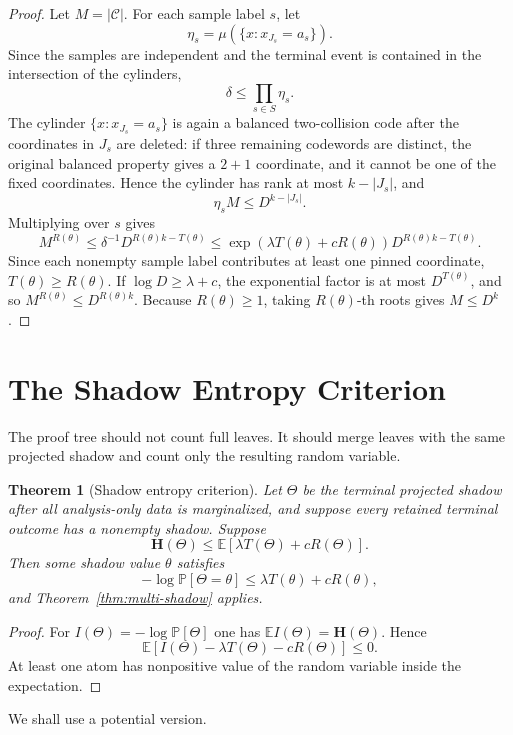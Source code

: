\documentclass[11pt]{article}
\newtheorem{theorem}{Theorem}[section]
\newcommand{\C}{\mathcal C}
\newcommand{\Prb}{\mathbb P}
\newcommand{\EE}{\mathbb E}
\newcommand{\bfH}{\mathbf H}
\begin{document}
\begin{proof}
Let $M=|\C|$.  For each sample label $s$, let
\[
  \eta_s=\mu(\{x:x_{J_s}=a_s\}).
\]
Since the samples are independent and the terminal event is contained in the
intersection of the cylinders,
\[
  \delta\le \prod_{s\in S}\eta_s.
\]
The cylinder $\{x:x_{J_s}=a_s\}$ is again a balanced two-collision code after
the coordinates in $J_s$ are deleted: if three remaining codewords are
distinct, the original balanced property gives a $2+1$ coordinate, and it
cannot be one of the fixed coordinates.  Hence the cylinder has rank at most
$k-|J_s|$, and
\[
  \eta_s M\le D^{k-|J_s|}.
\]
Multiplying over $s$ gives
\[
  M^{R(\theta)}
  \le \delta^{-1}D^{R(\theta)k-T(\theta)}
  \le \exp(\lambda T(\theta)+cR(\theta))
     D^{R(\theta)k-T(\theta)}.
\]
Since each nonempty sample label contributes at least one pinned coordinate,
$T(\theta)\ge R(\theta)$.  If $\log D\ge\lambda+c$, the exponential factor is
at most $D^{T(\theta)}$, and so $M^{R(\theta)}\le D^{R(\theta)k}$.
Because $R(\theta)\ge1$, taking $R(\theta)$-th roots gives $M\le D^k$.
\end{proof}

\section{The Shadow Entropy Criterion}

The proof tree should not count full leaves.  It should merge leaves with the
same projected shadow and count only the resulting random variable.

\begin{theorem}[Shadow entropy criterion]
\label{thm:shadow-entropy}
Let $\Theta$ be the terminal projected shadow after all analysis-only data is
marginalized, and suppose every retained terminal outcome has a nonempty
shadow.  Suppose
\[
  \bfH(\Theta)
  \le
  \EE[\lambda T(\Theta)+cR(\Theta)].
\]
Then some shadow value $\theta$ satisfies
\[
  -\log \Prb[\Theta=\theta]
  \le
  \lambda T(\theta)+cR(\theta),
\]
and Theorem~\ref{thm:multi-shadow} applies.
\end{theorem}

\begin{proof}
For $I(\Theta)=-\log\Prb[\Theta]$ one has
$\EE I(\Theta)=\bfH(\Theta)$.  Hence
\[
  \EE[I(\Theta)-\lambda T(\Theta)-cR(\Theta)]\le 0.
\]
At least one atom has nonpositive value of the random variable inside the
expectation.
\end{proof}

We shall use a potential version.
\end{document}
